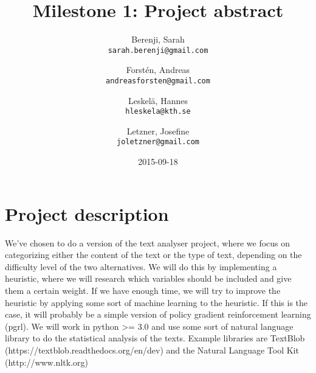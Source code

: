 \documentclass[a4paper]{article}
\title{Milestone 1: Project abstract}
\author{
  Berenji, Sarah\\
  \texttt{sarah.berenji@gmail.com}
  \and
  Forstén, Andreas\\
  \texttt{andreasforsten@gmail.com}
  \and
  Leskelä, Hannes\\
  \texttt{hleskela@kth.se}
  \and
  Letzner, Josefine\\
    \texttt{joletzner@gmail.com}
}
\date{2015-09-18}
\begin{document}
\maketitle
\section*{{Project description}}

We've chosen to do a version of the text analyser project, where we focus on categorizing either the content of the text or the type of text, depending on the difficulty level of the two alternatives. We will do this by implementing a heuristic, where we will research which variables should be included and give them a certain weight. If we have enough time, we will try to improve the heuristic by applying some sort of machine learning to the heuristic. If this is the case, it will probably be a simple version of policy gradient reinforcement learning (pgrl). We will work in python >= 3.0 and use some sort of natural language library to do the statistical analysis of the texts. Example libraries are TextBlob (https://textblob.readthedocs.org/en/dev) and the Natural Language Tool Kit (http://www.nltk.org)
\newline
\newline
\end{document}
